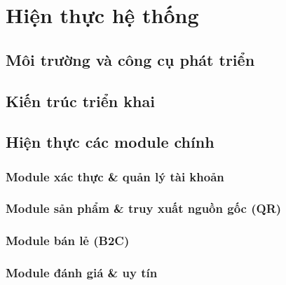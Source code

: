 \chapter{Hiện thực hệ thống}
\label{chap:hienthuc}


\section{Môi trường và công cụ phát triển}
\label{sec:moitruong}

\section{Kiến trúc triển khai}
\label{sec:trienkhai}

\section{Hiện thực các module chính}
\label{sec:hienthucmodule}

\subsection{Module xác thực \& quản lý tài khoản}

\subsection{Module sản phẩm \& truy xuất nguồn gốc (QR)}

\subsection{Module bán lẻ (B2C)}

\subsection{Module đánh giá \& uy tín}

